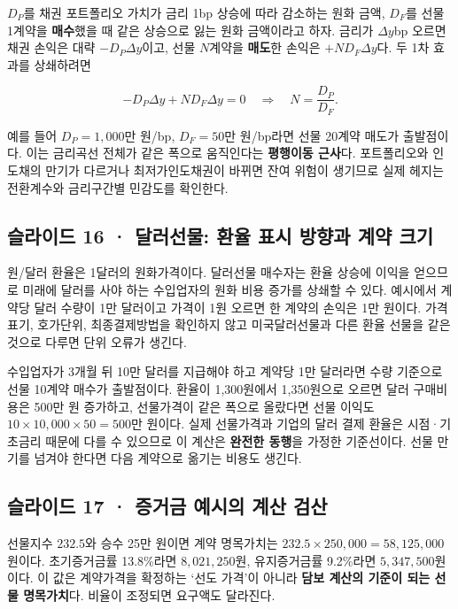 \documentclass[11pt,a4paper]{article}
\begin{document}
$D_P$를 채권 포트폴리오 가치가 금리 1bp 상승에 따라 감소하는 원화 금액, $D_F$를 선물 1계약을 \textbf{매수}했을 때 같은 상승으로 잃는 원화 금액이라고 하자. 금리가 $\Delta y$bp 오르면 채권 손익은 대략 $-D_P\Delta y$이고, 선물 $N$계약을 \textbf{매도}한 손익은 $+ND_F\Delta y$다. 두 1차 효과를 상쇄하려면\par

\[
-D_P\Delta y+ND_F\Delta y=0
\quad\Longrightarrow\quad N=\frac{D_P}{D_F}.
\]

예를 들어 $D_P=1{,}000$만 원/bp, $D_F=50$만 원/bp라면 선물 20계약 매도가 출발점이다. 이는 금리곡선 전체가 같은 폭으로 움직인다는 \textbf{평행이동 근사}다. 포트폴리오와 인도채의 만기가 다르거나 최저가인도채권이 바뀌면 잔여 위험이 생기므로 실제 헤지는 전환계수와 금리구간별 민감도를 확인한다.\par

\subsection{슬라이드 16 · 달러선물: 환율 표시 방향과 계약 크기}
원/달러 환율은 1달러의 원화가격이다. 달러선물 매수자는 환율 상승에 이익을 얻으므로 미래에 달러를 사야 하는 수입업자의 원화 비용 증가를 상쇄할 수 있다. 예시에서 계약당 달러 수량이 1만 달러이고 가격이 1원 오르면 한 계약의 손익은 1만 원이다. 가격 표기, 호가단위, 최종결제방법을 확인하지 않고 미국달러선물과 다른 환율 선물을 같은 것으로 다루면 단위 오류가 생긴다.\par

수입업자가 3개월 뒤 10만 달러를 지급해야 하고 계약당 1만 달러라면 수량 기준으로 선물 10계약 매수가 출발점이다. 환율이 1,300원에서 1,350원으로 오르면 달러 구매비용은 500만 원 증가하고, 선물가격이 같은 폭으로 올랐다면 선물 이익도 $10\times10{,}000\times50=500$만 원이다. 실제 선물가격과 기업의 달러 결제 환율은 시점·기초금리 때문에 다를 수 있으므로 이 계산은 \textbf{완전한 동행}을 가정한 기준선이다. 선물 만기를 넘겨야 한다면 다음 계약으로 옮기는 비용도 생긴다.\par

\subsection{슬라이드 17 · 증거금 예시의 계산 검산}
선물지수 $232.5$와 승수 25만 원이면 계약 명목가치는 $232.5\times250,000=58,125,000$원이다. 초기증거금률 13.8\%라면 $8,021,250$원, 유지증거금률 9.2\%라면 $5,347,500$원이다. 이 값은 계약가격을 확정하는 ‘선도 가격’이 아니라 \textbf{담보 계산의 기준이 되는 선물 명목가치}다. 비율이 조정되면 요구액도 달라진다.\par
\end{document}
